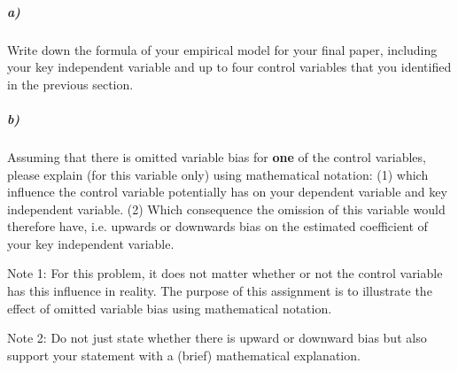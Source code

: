 \documentclass[12pt]{article}
\begin{document}
\subparagraph{a)} Write down the formula of your empirical model for your final paper, including your key independent variable and up to four control variables that you identified in the previous section.

\subparagraph{b)} Assuming that there is omitted variable bias for \textbf{one} of the control variables, please explain (for this variable only) using mathematical notation: (1) which influence the control variable potentially has on your dependent variable and key independent variable. (2) Which consequence the omission of this variable would therefore have, i.e. upwards or downwards bias on the estimated coefficient of your key independent variable.

Note 1: For this problem, it does not matter whether or not the control variable has this influence in reality. The purpose of this assignment is to illustrate the effect of omitted variable bias using mathematical notation.

Note 2: Do not just state whether there is upward or downward bias but also support your statement with a (brief) mathematical explanation.
\end{document}
